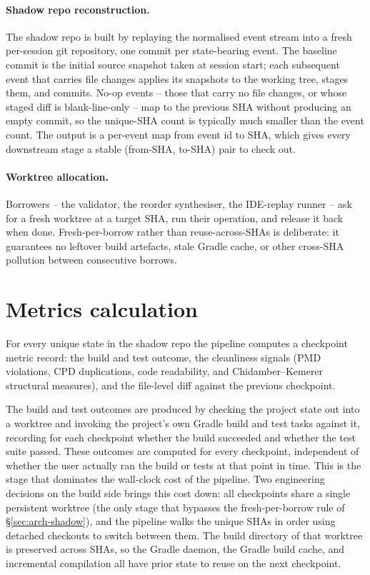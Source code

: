 \paragraph{Shadow repo reconstruction.}
The shadow repo is built by replaying the normalised event stream into a fresh per-session git repository, one commit per state-bearing event. The baseline commit is the initial source snapshot taken at session start; each subsequent event that carries file changes applies its snapshots to the working tree, stages them, and commits. No-op events -- those that carry no file changes, or whose staged diff is blank-line-only -- map to the previous SHA without producing an empty commit, so the unique-SHA count is typically much smaller than the event count. The output is a per-event map from event id to SHA, which gives every downstream stage a stable (from-SHA, to-SHA) pair to check out.

\paragraph{Worktree allocation.}
Borrowers -- the validator, the reorder synthesiser, the IDE-replay runner -- ask for a fresh worktree at a target SHA, run their operation, and release it back when done. Fresh-per-borrow rather than reuse-across-SHAs is deliberate: it guarantees no leftover build artefacts, stale Gradle cache, or other cross-SHA pollution between consecutive borrows.

\section{Metrics calculation}
\label{sec:arch-metrics}

For every unique state in the shadow repo the pipeline computes a checkpoint metric record: the build and test outcome, the cleanliness signals (PMD violations, CPD duplications, code readability, and Chidamber--Kemerer structural measures), and the file-level diff against the previous checkpoint.

The build and test outcomes are produced by checking the project state out into a worktree and invoking the project's own Gradle build and test tasks against it, recording for each checkpoint whether the build succeeded and whether the test suite passed. These outcomes are computed for every checkpoint, independent of whether the user actually ran the build or tests at that point in time. This is the stage that dominates the wall-clock cost of the pipeline. Two engineering decisions on the build side brings this cost down: all checkpoints share a single persistent worktree (the only stage that bypasses the fresh-per-borrow rule of \S\ref{sec:arch-shadow}), and the pipeline walks the unique SHAs in order using detached checkouts to switch between them. The build directory of that worktree is preserved across SHAs, so the Gradle daemon, the Gradle build cache, and incremental compilation all have prior state to reuse on the next checkpoint.

